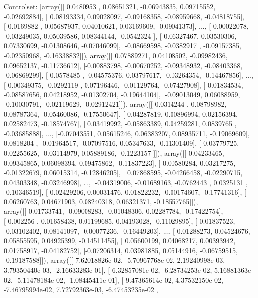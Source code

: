 \documentclass{article}
\begin{document}
Controlset: [array([[ 0.0480953 ,  0.08651321, -0.06943835,  0.09715552, -0.02692884],
       [ 0.08193334,  0.09028097, -0.09168358, -0.08959668, -0.04818755],
       [-0.0169882 ,  0.05687937,  0.04010621,  0.03169609, -0.09041373],
       ..., 
       [-0.00022078, -0.03249035,  0.05039586,  0.08344144, -0.0542324 ],
       [ 0.06327467,  0.03530306,  0.07330699, -0.01308646, -0.07046099],
       [-0.08669598, -0.0382917 , -0.09157385, -0.02350968, -0.16338832]]), array([[ 0.07889271,  0.04108502, -0.09982436,  0.09652137, -0.11736612],
       [-0.00883798, -0.00670252, -0.09348932, -0.08403368, -0.06869299],
       [ 0.0578485 , -0.04575376,  0.03797617, -0.03264354, -0.14467856],
       ..., 
       [-0.00349375, -0.0292119 ,  0.07196446, -0.01129764, -0.07427908],
       [-0.01834534, -0.08587656,  0.04218952, -0.01302704, -0.19644104],
       [-0.09013049,  0.06088959, -0.10030791, -0.02119629, -0.02912421]]), array([[-0.0314244 ,  0.08798982,  0.08787364, -0.05460086, -0.17550647],
       [-0.04287819,  0.00896994,  0.02156394,  0.02582473, -0.18574767],
       [ 0.03419992, -0.05863389,  0.04259281,  0.0839765 , -0.03685888],
       ..., 
       [-0.07043551,  0.05615246,  0.06383207,  0.08935711, -0.19069609],
       [ 0.0818204 , -0.01964517, -0.07097516,  0.05347633, -0.11301409],
       [ 0.03779725,  0.02255625, -0.03114979,  0.05889186, -0.1223157 ]]), array([[ 0.04233465,  0.09345865,  0.06098394,  0.09475862, -0.11837223],
       [ 0.00580284,  0.03217275, -0.01322679,  0.06015314, -0.12846205],
       [ 0.07868595, -0.04266458, -0.02290715,  0.04303348, -0.03246998],
       ..., 
       [-0.04319006, -0.01689163, -0.0762443 ,  0.0325131 , -0.10346519],
       [-0.02429206,  0.00031476,  0.01822232, -0.00174607, -0.17741316],
       [ 0.06260763,  0.04671903,  0.08240318,  0.06321371, -0.18557765]]), array([[-0.01733741, -0.09008283, -0.01048306,  0.02287784, -0.17422754],
       [-0.002256  ,  0.01658438,  0.01199685,  0.04193028, -0.11029895],
       [ 0.01837523, -0.03102402,  0.08141097, -0.00077236, -0.16449203],
       ..., 
       [-0.01288273,  0.04524676,  0.05855595,  0.04925399, -0.14511455],
       [ 0.05600199,  0.04068217,  0.00393942,  0.01758917, -0.04182752],
       [-0.07206314,  0.03981885,  0.05144916, -0.06759515, -0.19187588]]), array([[  7.62018826e-02,  -5.70967768e-02,   2.19240998e-03,
          3.79350440e-03,  -2.16633283e-01],
       [  6.32857081e-02,  -6.28734253e-02,   5.16881363e-02,
         -5.11478184e-02,  -1.08445411e-01],
       [  9.47365614e-02,   4.37532150e-02,  -7.46795994e-02,
          7.72792363e-03,  -6.47453235e-02],
\end{document}
